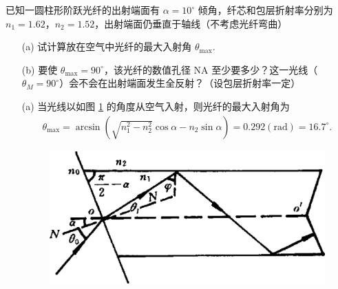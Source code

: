 \documentclass{assignment}
\begin{document}
\begin{prob}
    已知一圆柱形阶跃光纤的出射端面有 $\alpha=10^{\circ}$ 倾角，纤芯和包层折射率分别为 $n_1=1.62$，$n_2=1.52$，出射端面仍垂直于轴线（不考虑光纤弯曲）
    \begin{itemize}
        \item[(a)] 试计算放在空气中光纤的最大入射角 $\theta_{\max}$.
        \item[(b)] 要使 $\theta_{\max}=90^{\circ}$，该光纤的数值孔径 NA 至少要多少？这一光线（$\theta_M=90^{\circ}$）会不会在出射端面发生全反射？（设包层折射率一定）
    \end{itemize}
\end{prob}
\begin{sol}
    \begin{itemize}
        \item[(a)] 当光线以如图 \ref{1-6-1} 的角度从空气入射，则光纤的最大入射角为
        \begin{align}
            \theta_{\max}=\arcsin\left(\sqrt{n_1^2-n_2^2}\cos\alpha-n_2\sin\alpha\right)=0.292(\text{rad})=16.7^{\circ}.
        \end{align}
        \begin{figure}[h]
            \centering
            \includegraphics[width=.5\columnwidth]{1-5-1.png}
            \caption{}
            \label{1-6-1}
        \end{figure}


\end{itemize}
\end{sol}
\end{document}

